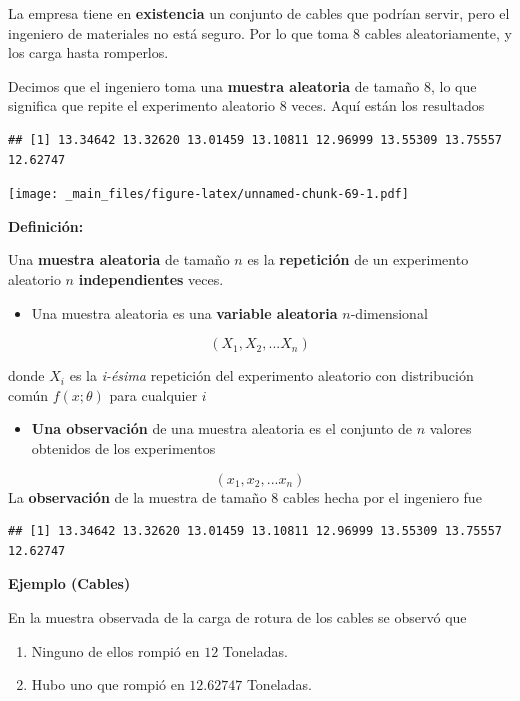\documentclass[
]{book}
\providecommand{\tightlist}{%
  \setlength{\itemsep}{0pt}\setlength{\parskip}{0pt}}
\begin{document}
La empresa tiene en \textbf{existencia} un conjunto de cables que podrían servir, pero el ingeniero de materiales no está seguro. Por lo que toma \(8\) cables aleatoriamente, y los carga hasta romperlos.

Decimos que el ingeniero toma una \textbf{muestra aleatoria} de tamaño \(8\), lo que significa que repite el experimento aleatorio \(8\) veces. Aquí están los resultados

\begin{verbatim}
## [1] 13.34642 13.32620 13.01459 13.10811 12.96999 13.55309 13.75557 12.62747
\end{verbatim}

\texttt{[image: \_main\_files/figure-latex/unnamed-chunk-69-1.pdf]}

\textbf{Definición:}

Una \textbf{muestra aleatoria} de tamaño \(n\) es la \textbf{repetición} de un experimento aleatorio \(n\) \textbf{independientes} veces.

\begin{itemize}
\tightlist
\item
  Una muestra aleatoria es una \textbf{variable aleatoria} \(n\)-dimensional
\end{itemize}

\[(X_1, X_2, ... X_n)\]

donde \(X_i\) es la \emph{i-ésima} repetición del experimento aleatorio con distribución común \(f(x; \theta)\) para cualquier \(i\)

\begin{itemize}
\tightlist
\item
  \textbf{Una observación} de una muestra aleatoria es el conjunto de \(n\) valores obtenidos de los experimentos
\end{itemize}

\[(x_1, x_2, ... x_n)\]
La \textbf{observación} de la muestra de tamaño \(8\) cables hecha por el ingeniero fue

\begin{verbatim}
## [1] 13.34642 13.32620 13.01459 13.10811 12.96999 13.55309 13.75557 12.62747
\end{verbatim}

\textbf{Ejemplo (Cables)}

En la muestra observada de la carga de rotura de los cables se observó que

\begin{enumerate}
\def\labelenumi{\arabic{enumi})}
\item
  Ninguno de ellos rompió en \(12\) Toneladas.
\item
  Hubo uno que rompió en \(12.62747\) Toneladas.
\end{enumerate}
\end{document}
